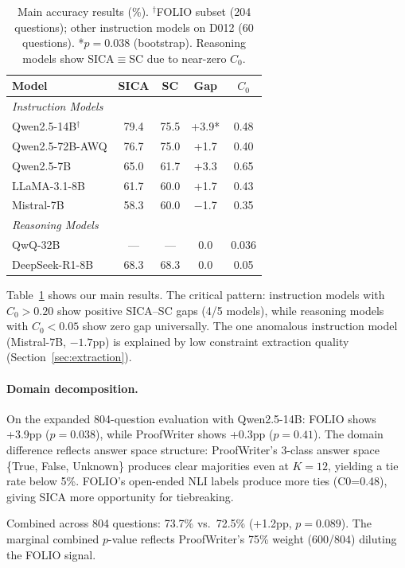 \documentclass[11pt,a4paper]{article}
\begin{document}
\begin{table}[t]
\centering
\small
\begin{tabular}{@{}lcccc@{}}
\toprule
\textbf{Model} & \textbf{SICA} & \textbf{SC} & \textbf{Gap} & \textbf{$C_0$} \\
\midrule
\multicolumn{5}{l}{\textit{Instruction Models}} \\
Qwen2.5-14B$^\dagger$ & 79.4 & 75.5 & +3.9* & 0.48 \\
Qwen2.5-72B-AWQ & 76.7 & 75.0 & +1.7 & 0.40 \\
Qwen2.5-7B & 65.0 & 61.7 & +3.3 & 0.65 \\
LLaMA-3.1-8B & 61.7 & 60.0 & +1.7 & 0.43 \\
Mistral-7B & 58.3 & 60.0 & $-$1.7 & 0.35 \\
\midrule
\multicolumn{5}{l}{\textit{Reasoning Models}} \\
QwQ-32B & --- & --- & 0.0 & 0.036 \\
DeepSeek-R1-8B & 68.3 & 68.3 & 0.0 & 0.05 \\
\bottomrule
\end{tabular}
\caption{Main accuracy results (\%). $^\dagger$FOLIO subset (204 questions); other instruction models on D012 (60 questions). *$p=0.038$ (bootstrap). Reasoning models show SICA$\equiv$SC due to near-zero $C_0$.}
\label{tab:main}
\end{table}

Table~\ref{tab:main} shows our main results. The critical pattern: instruction models with $C_0 > 0.20$ show positive SICA--SC gaps (4/5 models), while reasoning models with $C_0 < 0.05$ show zero gap universally. The one anomalous instruction model (Mistral-7B, $-1.7$pp) is explained by low constraint extraction quality (Section~\ref{sec:extraction}).

\paragraph{Domain decomposition.} On the expanded 804-question evaluation with Qwen2.5-14B: FOLIO shows +3.9pp ($p=0.038$), while ProofWriter shows +0.3pp ($p=0.41$). The domain difference reflects answer space structure: ProofWriter's 3-class answer space \{True, False, Unknown\} produces clear majorities even at $K=12$, yielding a tie rate below 5\%. FOLIO's open-ended NLI labels produce more ties (C0=0.48), giving SICA more opportunity for tiebreaking.

Combined across 804 questions: 73.7\% vs.\ 72.5\% (+1.2pp, $p=0.089$). The marginal combined $p$-value reflects ProofWriter's 75\% weight (600/804) diluting the FOLIO signal.
\end{document}
